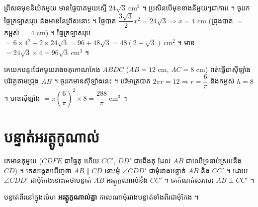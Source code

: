 \begin{pro}
ព្រីសឆមុខនិយ័តមួយ មានផ្ទៃបាតមួយស្មើ $24\sqrt{3}\ \text{cm}^2$ ។ ប្រសិនបើមុខខាងនីមួយៗជាការេ ។ ចូររកផ្ទៃក្រឡាសរុប និងមាឌនៃព្រីសនោះ ។
\ans
ផ្ទៃបាត $\dfrac{3\sqrt{3}}{2}x^2 = 24\sqrt{3} \Rightarrow x = 4$ cm (ជ្រុងបាត $=$ កម្ពស់ $= 4$ cm) ។ ផ្ទៃក្រឡាសរុប $= 6\times 4^2 + 2\times 24\sqrt{3} = 96 + 48\sqrt{3} = 48(2 + \sqrt{3})\ \text{cm}^2$ ។ មាឌ $= 24\sqrt{3}\times 4 = 96\sqrt{3}\ \text{cm}^3$ ។
\end{pro}

\begin{pro}
គេយកបន្ទះដែកមួយរាងចតុកោណកែង $ABDC$ ($AB = 12$ cm, $AC = 8$ cm) ពត់ធ្វើជាស៊ីឡាំងបរិវត្តតាមជ្រុង $AB$ ។ ចូររកមាឌស៊ីឡាំងនេះ ។
\ans
បរិមាត្របាត $2\pi r = 12 \Rightarrow r = \dfrac{6}{\pi}$ និងកម្ពស់ $h = 8$ ។ មាឌស៊ីឡាំង $= \pi\left(\dfrac{6}{\pi}\right)^2\times 8 = \dfrac{288}{\pi}\ \text{cm}^3$ ។
\end{pro}

\section{បន្ទាត់អរត្តូកូណាល់}
គេមានតុមួយ ($CDFE$ ជាផ្ទៃតុ ហើយ $CC'$, $DD'$ ជាជើងតុ ដែល $AB$ ជាឈើទ្រនាប់ស្របនឹង $CD$) ។ គេសង្កេតឃើញថា $AB \parallel CD$ នោះមុំ $\angle CDD'$ ជាមុំរវាងបន្ទាត់ $AB$ និង $CC'$ ។ ដោយ $\angle CDD'$ ជាមុំកែងនោះគេថាបន្ទាត់ $AB$ អរត្តូកូណាល់នឹង $CC'$ ។ គេកំណត់សរសេរ $AB \perp CC'$ ។

\begin{definition}[និយមន័យ]
បន្ទាត់ពីរនៅក្នុងលំហ \textbf{អរត្តូកូណាល់គ្នា} កាលណាមុំរវាងបន្ទាត់ទាំងពីរជាមុំកែង ។
\end{definition}

